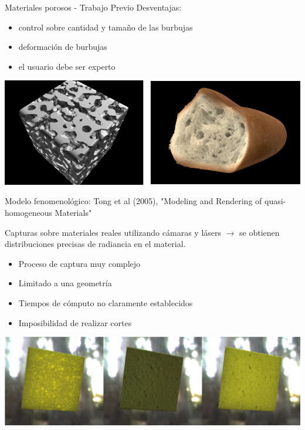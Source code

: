 \documentclass[spanish]{beamer}
\begin{document}
\begin{frame}{Materiales porosos - Trabajo Previo}
Desventajas: 
\begin{itemize}
\item control sobre cantidad y tamaño de las burbujas
\item deformación de burbujas
\item el usuario debe ser experto
\end{itemize}

\includegraphics[scale = 0.3]{../figures/ratatouille}

\end{frame}

\begin{frame}

Modelo fenomenológico: Tong et al (2005), "Modeling and Rendering of quasi-homogeneous Materials"

Capturas sobre materiales reales utilizando cámaras y lásers $\rightarrow$ se obtienen distribuciones precisas de radiancia en el material.

\begin{itemize}
\item Proceso de captura muy complejo
\item Limitado a una geometría
\item Tiempos de cómputo no claramente establecidos
\item Imposibilidad de realizar cortes
\end{itemize}

\includegraphics[scale = 0.3]{../figures/esponja}

\end{frame}
\end{document}
